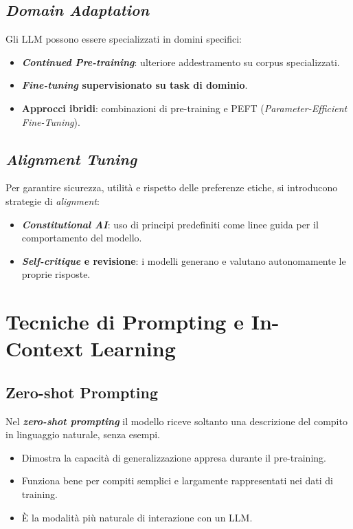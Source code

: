 \subsection{\textit{Domain Adaptation}}
Gli LLM possono essere specializzati in domini specifici:
\begin{itemize}
    \item \textbf{\textit{Continued Pre-training}}: ulteriore addestramento su corpus specializzati.
    \item \textbf{\textit{Fine-tuning} supervisionato su task di dominio}.
    \item \textbf{Approcci ibridi}: combinazioni di pre-training e PEFT (\textit{Parameter-Efficient Fine-Tuning}).
\end{itemize}

\subsection{\textit{Alignment Tuning}}
Per garantire sicurezza, utilità e rispetto delle preferenze etiche,
si introducono strategie di \textit{alignment}:
\begin{itemize}
    \item \textbf{\textit{Constitutional AI}}: uso di principi predefiniti come linee guida per il comportamento del modello.
    \item \textbf{\textit{Self-critique} e revisione}: i modelli generano e valutano autonomamente le proprie risposte. \cite{touvron2023llama2}\cite{ouyang2022rlhf}
\end{itemize}


\newpage
\section{Tecniche di Prompting e In-Context Learning}

\subsection{Zero-shot Prompting}
Nel \textbf{\textit{zero-shot prompting}} il modello riceve soltanto una descrizione del compito
in linguaggio naturale, senza esempi.
\begin{itemize}
    \item Dimostra la capacità di generalizzazione appresa durante il pre-training.
    \item Funziona bene per compiti semplici e largamente rappresentati nei dati di training.
    \item È la modalità più naturale di interazione con un LLM.
\end{itemize}

